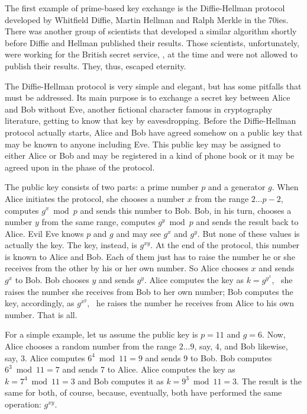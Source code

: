 \documentclass{scrreprt}
\begin{document}
The first example of prime-based key exchange
is the Diffie-Hellman protocol
developed by Whitfield Diffie, Martin Hellman
and Ralph Merkle in the 70ies.
There was another group of scientists
that developed a similar algorithm shortly before
Diffie and Hellman published their results.
Those scientists, unfortunately, were working for the British 
secret service, , at the time and were not allowed
to publish their results. 
They, thus, escaped eternity.

The Diffie-Hellman protocol is very simple and elegant,
but has some pitfalls that must be addressed.
Its main purpose is to exchange a secret key
between Alice and Bob without Eve, another
fictional character famous in cryptography literature,
getting to know that key by eavesdropping. 
Before the Diffie-Hellman protocol actually starts,
Alice and Bob have agreed somehow on a public key
that may be known to anyone including Eve.
This public key may be assigned to either Alice or Bob
and may be registered in a kind of phone book
or it may be agreed upon in the  phase
of the protocol.

The public key consists of two parts:
a prime number $p$ and a generator $g$.
When Alice initiates the protocol,
she chooses a number $x$ from the range
$2\dots p-2$, computes $g^x \bmod{p}$ and
sends this number to Bob.
Bob, in his turn, chooses a number $y$
from the same range, computes $g^y \bmod{p}$
and sends the result back to Alice.
Evil Eve knows $p$ and $g$ and may see $g^x$ and $g^y$.
But none of these values is actually the key.
The key, instead, is $g^{xy}$.
At the end of the protocol,
this number is known to Alice and Bob.
Each of them just has to raise the number he or she receives
from the other by his or her own number.
So Alice chooses $x$ and sends $g^x$ to Bob.
Bob chooses $y$ and sends $g^y$.
Alice computes the key as $k = g^{y^x}$,
\ie\ she raises the number she receives from Bob
to her own number;
Bob computes the key, accordingly, as 
$g^{x^y}$, \ie\ he raises the number he receives from Alice
to his own number.
That is all.

For a simple example, let us assume the public key
is $p=11$ and $g=6$. 
Now, Alice chooses a random number from the range
$2\dots 9$, say, 4, and Bob likewise, say, 3.
Alice computes $6^4 \bmod{11} = 9$ and sends 9 to Bob.
Bob computes $6^3 \bmod{11} = 7$ and sends 7 to Alice.
Alice computes the key as $k = 7^4 \bmod{11} = 3$ and
Bob computes it as $k = 9^3 \bmod{11} = 3$.
The result is the same for both, of course,
because, eventually, both have performed the same operation:
$g^{xy}$.
\end{document}
